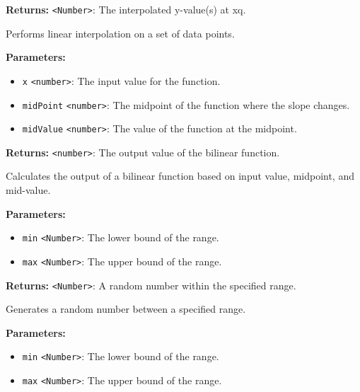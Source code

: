 \documentclass[12pt,a4paper]{article}
\begin{document}
\noindent \textbf{Returns:} \texttt{<Number>}: The interpolated y-value(s) at xq.

\noindent Performs linear interpolation on a set of data points.

\vspace{5mm}
\noindent {}


\noindent \textbf{Parameters:}
\begin{itemize}
  \item \texttt{x} \texttt{<number>}: The input value for the function.
  \item \texttt{midPoint} \texttt{<number>}: The midpoint of the function where the slope changes.
  \item \texttt{midValue} \texttt{<number>}: The value of the function at the midpoint.
\end{itemize}

\noindent \textbf{Returns:} \texttt{<number>}: The output value of the bilinear function.

\noindent Calculates the output of a bilinear function based on input value, midpoint, and mid-value.

\vspace{5mm}
\noindent {}


\noindent \textbf{Parameters:}
\begin{itemize}
  \item \texttt{min} \texttt{<Number>}: The lower bound of the range.
  \item \texttt{max} \texttt{<Number>}: The upper bound of the range.
\end{itemize}

\noindent \textbf{Returns:} \texttt{<Number>}: A random number within the specified range.

\noindent Generates a random number between a specified range.

\vspace{5mm}
\noindent {}


\noindent \textbf{Parameters:}
\begin{itemize}
  \item \texttt{min} \texttt{<Number>}: The lower bound of the range.
  \item \texttt{max} \texttt{<Number>}: The upper bound of the range.
\end{itemize}
\end{document}
